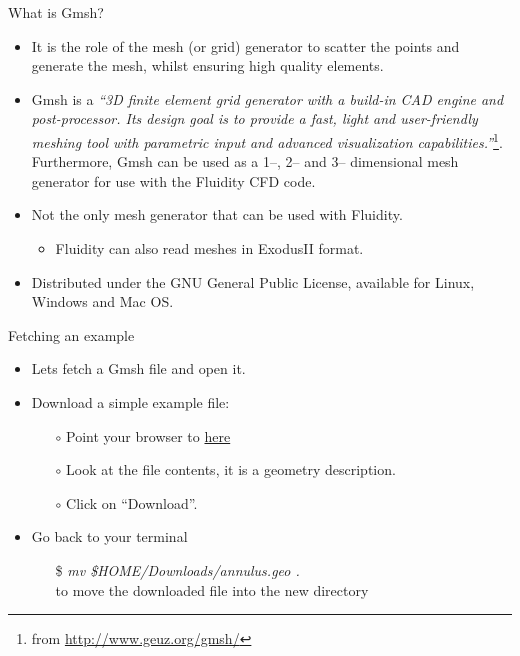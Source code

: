 \documentclass[t]{beamer}
\begin{document}
\begin{frame}{What is Gmsh?}
\begin{itemize}
\item It is the role of the mesh (or grid) generator to scatter the points and generate the mesh, whilst ensuring high quality elements.
\item Gmsh is a \emph{``3D finite element grid generator with a build-in CAD engine and post-processor. Its design goal is to provide a fast, light and user-friendly meshing tool with parametric input and advanced visualization capabilities.''}\footnote{from \url{http://www.geuz.org/gmsh/}}. Furthermore, Gmsh can be used as a 1--, 2-- and 3-- dimensional mesh generator for use with the Fluidity CFD code.
\item Not the only mesh generator that can be used with Fluidity.
\begin{itemize}
   \item Fluidity can also read meshes in ExodusII format.
\end{itemize}
\item Distributed under the GNU General Public License, available for Linux, Windows and Mac OS.
\end{itemize}
\end{frame}

\begin{frame}{Fetching an example}
\begin{itemize}
   \item Lets fetch a Gmsh file and open it.
   \item Download a simple example file:
   \begin{itemize}
      \item[$\circ$] Point your browser to \href{http://figshare.com/s/b0936b565f8211e4aee906ec4b8d1f61}{here}
      \item[$\circ$] Look at the file contents, it is a geometry description.
      \item[$\circ$] Click on ``Download''.
   \end{itemize}\vspace{10pt}
   \item Go back to your terminal
   \begin{itemize}
      \item[\$] \emph{mv \$HOME/Downloads/annulus.geo .} \\to move the downloaded file into the new directory
   \end{itemize}
\end{itemize}
\end{frame}
\end{document}
